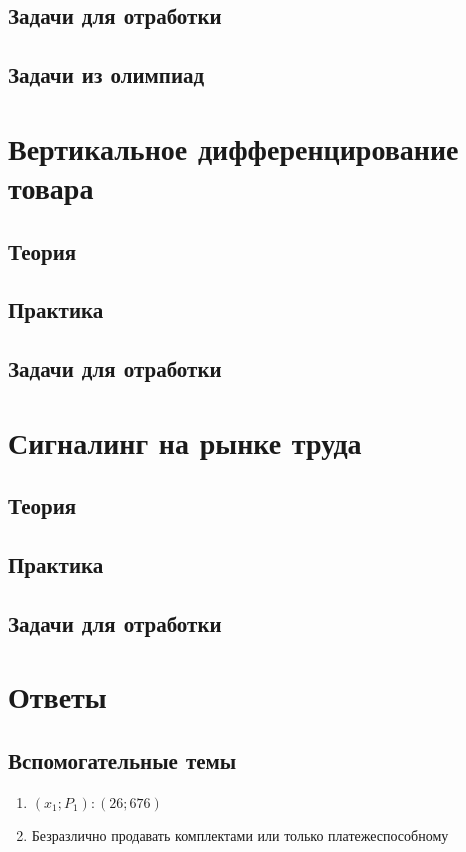 \subsection{Задачи для отработки}
\subsection{Задачи из олимпиад}
\begin{mybox}
    
\end{mybox}

\section{Вертикальное дифференцирование товара}
\subsection{Теория}
\subsection{Практика}
\subsection{Задачи для отработки}

\section{Сигналинг на рынке труда}
\subsection{Теория}
\subsection{Практика}
\subsection{Задачи для отработки}

\section{Ответы}
\subsection{Вспомогательные темы}
\begin{enumerate}
    \item $(x_1;P_1): (26;676)$
    \item Безразлично продавать комплектами или только платежеспособному
\end{enumerate}
